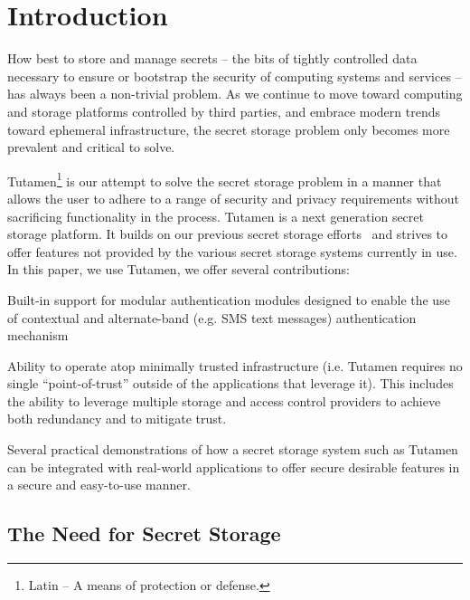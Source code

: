 \section{Introduction}
\label{sec:intro}

How best to store and manage secrets -- the bits of tightly controlled
data necessary to ensure or bootstrap the security of computing
systems and services -- has always been a non-trivial problem. As we
continue to move toward computing and storage platforms controlled by
third parties, and embrace modern trends toward ephemeral
infrastructure, the secret storage problem only becomes more prevalent
and critical to solve.

Tutamen\footnote{Latin -- A means of protection or defense.} is our
attempt to solve the secret storage problem in a manner that allows
the user to adhere to a range of security and privacy requirements
without sacrificing functionality in the process. Tutamen is a next
generation secret storage platform. It builds on our previous secret
storage efforts~\cite{custos-trios} and strives to offer features not
provided by the various secret storage systems currently in
use. In this paper, we use Tutamen, we offer several contributions:

\begin{packed_item}
\item Built-in support for modular authentication modules designed to
  enable the use of contextual and alternate-band (e.g. SMS text
  messages) authentication mechanism
\item Ability to operate atop minimally trusted infrastructure
  (i.e. Tutamen requires no single ``point-of-trust'' outside of the
  applications that leverage it). This includes the ability to
  leverage multiple storage and access control providers to achieve
  both redundancy and to mitigate trust.
\item Several practical demonstrations of how a secret storage system
  such as Tutamen can be integrated with real-world applications to
  offer secure desirable features in a secure and easy-to-use manner.
\end{packed_item}

\subsection{The Need for Secret Storage}

